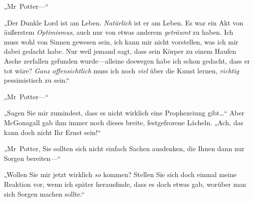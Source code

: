 „Mr~Potter—“

„Der Dunkle Lord ist am Leben. \emph{Natürlich} ist er am Leben. Es war ein Akt von äußerstem \emph{Optimismus}, auch nur von etwas anderem \emph{geträumt} zu haben. Ich muss wohl von Sinnen gewesen sein, ich kann mir nicht vorstellen, was ich mir dabei gedacht habe. Nur weil jemand sagt, dass sein Körper zu einem Haufen Asche zerfallen gefunden wurde—alleine deswegen habe ich schon gedacht, dass er tot wäre? \emph{Ganz offensichtlich} muss ich noch \emph{viel} über die Kunst lernen, \emph{richtig} pessimistisch zu sein.“

„Mr~Potter—“

„Sagen Sie mir zumindest, dass es nicht wirklich eine Prophezeiung gibt…“ Aber McGonagall gab ihm immer noch dieses breite, festgefrorene Lächeln. „Ach, das kann doch nicht Ihr Ernst sein!“

„Mr~Potter, Sie sollten sich nicht einfach Sachen ausdenken, die Ihnen dann nur Sorgen bereiten—“

„Wollen Sie mir jetzt wirklich \emph{so} kommen? Stellen Sie sich doch einmal meine Reaktion vor, wenn ich später herausfinde, dass es doch etwas gab, worüber man sich Sorgen machen sollte.“

